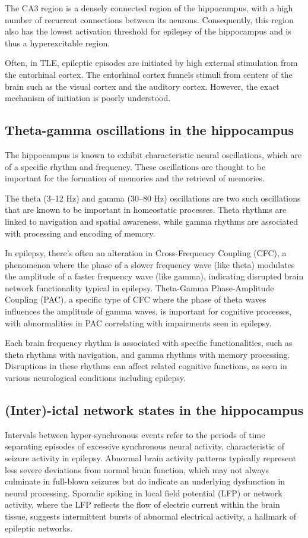 The CA3 region is a densely connected region of the hippocampus, with a high number of recurrent connections between its neurons.
Consequently, this region also has the lowest activation threshold for epilepsy of the hippocampus and is thus a hyperexcitable region.

Often, in TLE, epileptic episodes are initiated by high external stimulation from the entorhinal cortex.
The entorhinal cortex funnels stimuli from centers of the brain such as the visual cortex and the auditory cortex.
However, the exact mechanism of initiation is poorly understood.

\subsection{Theta-gamma oscillations in the hippocampus}
The hippocampus is known to exhibit characteristic neural oscillations, which are of a specific rhythm and frequency.
These oscillations are thought to be important for the formation of memories and the retrieval of memories.

The theta (3--12 Hz) and gamma (30--80 Hz) oscillations are two such oscillations that are known to be important in homeostatic processes.
Theta rhythms are linked to navigation and spatial awareness, while gamma rhythms are associated with processing and encoding of memory. 

In epilepsy, there's often an alteration in Cross-Frequency Coupling (CFC), a phenomenon where the phase of a slower frequency wave (like theta) modulates the amplitude of a faster frequency wave (like gamma), indicating disrupted brain network functionality typical in epilepsy. 
Theta-Gamma Phase-Amplitude Coupling (PAC), a specific type of CFC where the phase of theta waves influences the amplitude of gamma waves, is important for cognitive processes, with abnormalities in PAC correlating with impairments seen in epilepsy. 

Each brain frequency rhythm is associated with specific functionalities, such as theta rhythms with navigation, and gamma rhythms with memory processing. 
Disruptions in these rhythms can affect related cognitive functions, as seen in various neurological conditions including epilepsy.

\subsection{(Inter)-ictal network states in the hippocampus}
Intervals between hyper-synchronous events refer to the periods of time separating episodes of excessive synchronous neural activity, characteristic of seizure activity in epilepsy. 
Abnormal brain activity patterns typically represent less severe deviations from normal brain function, which may not always culminate in full-blown seizures but do indicate an underlying dysfunction in neural processing. 
Sporadic spiking in local field potential (LFP) or network activity, where the LFP reflects the flow of electric current within the brain tissue, suggests intermittent bursts of abnormal electrical activity, a hallmark of epileptic networks.

